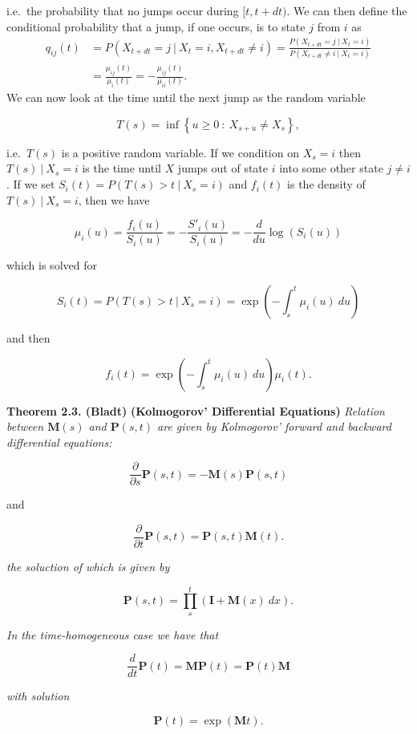\documentclass[
]{book}
\begin{document}
i.e.~the probability that no jumps occur during \([t,t+dt)\). We can then define the conditional probability that a jump, if one occurs, is to state \(j\) from \(i\) as
\begin{align*}
q_{ij}(t)&=P(X_{t+dt}=j\ \vert\  X_t=i,X_{t+dt}\ne i)=\frac{P(X_{t+dt}=j\ \vert\  X_t=i)}{P(X_{t+dt}\ne i\ \vert\  X_t=i)}\\
&=\frac{\mu_{ij}(t)}{\mu_i(t)}=-\frac{\mu_{ij}(t)}{\mu_{ii}(t)}.
\end{align*}
We can now look at the time until the next jump as the random variable

\[
T(s)=\inf\left\{u\ge 0\ :\ X_{s+u}\ne X_s\right\},
\]

i.e.~\(T(s)\) is a positive random variable. If we condition on \(X_s=i\) then \(T(s)\ \vert\ X_s=i\) is the time until \(X\) jumps out of state \(i\) into some other state \(j\ne i\). If we set \(S_i(t)=P(T(s)>t\ \vert\ X_s=i)\) and \(f_i(t)\) is the density of \(T(s)\ \vert\ X_s=i\), then we have

\[
\mu_i(u)=\frac{f_i(u)}{S_i(u)}=-\frac{S'_i(u)}{S_i(u)}=-\frac{d}{du}\log(S_i(u))
\]

which is solved for

\[
S_i(t)=P(T(s)>t\ \vert\ X_s=i)=\exp\left(-\int_s^t \mu_i(u)\ du\right)
\]

and then

\[
f_i(t)=\exp\left(-\int_s^t \mu_i(u)\ du\right)\mu_i(t).
\]

\textbf{Theorem 2.3. (Bladt)} \textbf{(Kolmogorov' Differential Equations)} \emph{Relation between \(\mathbf{M}(s)\) and \(\mathbf{P}(s,t)\) are given by Kolmogorov' forward and backward differential equations:}

\[
\frac{\partial}{\partial s}\mathbf{P}(s,t)=-\mathbf{M}(s)\mathbf{P}(s,t)
\]

and

\[
\frac{\partial}{\partial t}\mathbf{P}(s,t)=\mathbf{P}(s,t)\mathbf{M}(t).
\]

\emph{the soluction of which is given by}

\[
\mathbf{P}(s,t)=\prod_s^t(\mathbf{I}+\mathbf{M}(x)\ dx).
\]

\emph{In the time-homogeneous case we have that}

\[
\frac{d}{d t}\mathbf{P}(t)=\mathbf{M}\mathbf{P}(t)=\mathbf{P}(t)\mathbf{M}
\]

\emph{with solution}

\[
\mathbf{P}(t)=\exp(\mathbf{M}t).
\]
\end{document}
